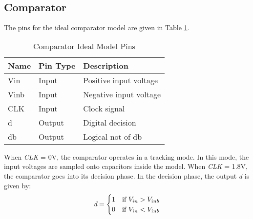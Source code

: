 \subsection{Comparator}
The pins for the ideal comparator model are given in Table \ref{tab:comppins}.
\begin{table}[htbp]
\begin{center}
\begin{tabular}{|l|l|l|}
\hline
Name & Pin Type & Description \\ \hline
Vin & Input & Positive input voltage \\ \hline
Vinb & Input & Negative input voltage \\ \hline
CLK & Input & Clock signal \\ \hline
d & Output & Digital decision \\ \hline
db & Output & Logical not of db \\ \hline
\end{tabular}
\end{center}
\caption{Comparator Ideal Model Pins}
\label{tab:comppins}
\end{table}
When \emph{CLK} = 0V, the comparator operates in a tracking mode. In this mode, the input voltages are sampled onto capacitors inside the model. When \emph{CLK} = 1.8V, the comparator goes into its decision phase. In the decision phase, the output \emph{d} is given by:
\begin{equation}
\emph{d} = \begin{cases}
				1 & \mbox{if } V_{in} > V_{inb} \\
				0 & \mbox{if } V_{in} < V_{inb}
			\end{cases}
\end{equation}

